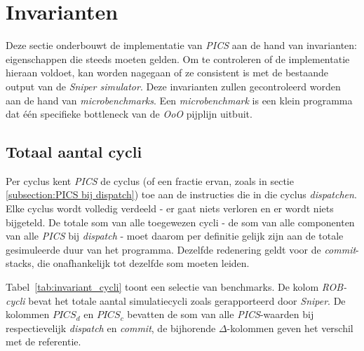 \documentclass[12pt,a4paper,faculty=ea,language=nl]{ugent-doc}
\begin{document}
\newpage


\section{Invarianten}
\label{sectie:invarianten}
Deze sectie onderbouwt de implementatie van \textit{PICS} aan de hand van invarianten: eigenschappen die steeds moeten gelden. Om te controleren of de implementatie hieraan voldoet, kan worden nagegaan of ze consistent is met de bestaande output van de \textit{Sniper simulator}. Deze invarianten zullen gecontroleerd worden aan de hand van \textit{microbenchmarks}. Een \textit{microbenchmark} is een klein programma dat één specifieke bottleneck van de \textit{OoO} pijplijn uitbuit.

\subsection{Totaal aantal cycli}
Per cyclus kent \textit{PICS} de cyclus (of een fractie ervan, zoals in sectie \ref{subsection:PICS bij dispatch}) toe aan de instructies die in die cyclus \textit{dispatchen}. Elke cyclus wordt volledig verdeeld - er gaat niets verloren en er wordt niets bijgeteld. De totale som van alle toegewezen cycli - de som van alle componenten van alle \textit{PICS} bij \textit{dispatch} - moet daarom per definitie gelijk zijn aan de totale gesimuleerde duur van het programma. Dezelfde redenering geldt voor de \textit{commit}-stacks, die onafhankelijk tot dezelfde som moeten leiden.

Tabel~\ref{tab:invariant_cycli} toont een selectie van benchmarks. De kolom \textit{ROB-cycli} bevat het totale aantal simulatiecycli zoals gerapporteerd door \textit{Sniper}. De kolommen \textit{\(PICS_d\)} en \textit{\(PICS_c\)} bevatten de som van alle \textit{PICS}-waarden bij respectievelijk \textit{dispatch} en \textit{commit}, de bijhorende \(\Delta\)-kolommen geven het verschil met de referentie.
\end{document}

